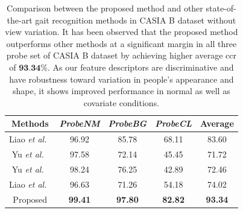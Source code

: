 \begin{table}[t]
	\centering
	\caption [Comparison between the proposed method and other state-of-the-art gait recognition methods in CASIA B dataset without view variation]
	{Comparison between the proposed method and other state-of-the-art gait recognition methods in CASIA B dataset without view variation. It has been observed that the proposed method outperforms other methods at a significant margin in all three probe set of CASIA B dataset by achieving higher average \gls{ccr} of $\textbf{93.34\%}$. As our feature descriptors are discriminative and have robustness toward variation in people's appearance and shape, it shows improved performance in normal as well as covariate conditions.\label{table:comp_casia_b_without_view}}
	
	{\begin{tabular*}{25pc}{ccccc}\hline
			
			Methods &\textit{ProbeNM} &\textit{ProbeBG} &\textit{ProbeCL} &Average\\
			\hline
			
			Liao \textit{et al.}~\cite{Liao_17} &96.92 &85.78 &68.11 &83.60 \\ 
			
			\noalign{\smallskip}
			Yu \textit{et al.}~\cite{Yu_17_spae}  &97.58  &72.14 &45.45 &71.72 \\
			
			\noalign{\smallskip}
			Yu \textit{et al.}~\cite{Yu_19} &98.24  &76.25  &42.89  &72.46 \\
			
			\noalign{\smallskip}
			Liao \textit{et al.}~\cite{Liao_19}  &96.63  &71.26  &54.18  &74.02 \\
			
			\noalign{\smallskip}
			Proposed &\textbf{99.41} &\textbf{97.80} &\textbf{82.82} &\textbf{93.34} \\
			\hline
	\end{tabular*}}{}
\end{table}

